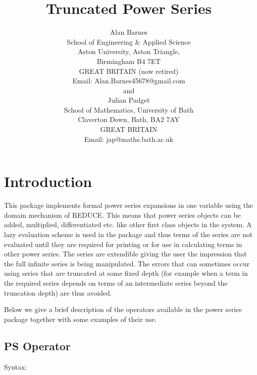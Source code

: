 \title{Truncated Power Series}
\date{}
\author{Alan Barnes \\
School of Engineering \& Applied Science  \\
Aston University, Aston Triangle, \\
Birmingham B4 7ET \\ GREAT BRITAIN  (now retired)\\
Email: Alan.Barnes45678@gmail.com \\[0.1in]
and \\[0.1in]
Julian Padget \\
School of Mathematics, University of Bath \\
Claverton Down, Bath, BA2 7AY \\
GREAT BRITAIN \\
Email: jap@maths.bath.ac.uk}

\maketitle
{} 
 
\section{Introduction}
This package implements formal power series expansions in one
variable using the domain mechanism of REDUCE. This means that power
series objects can be added, multiplied, differentiated etc. like other
first class objects in the system. A lazy evaluation scheme is used in
the package and thus terms of the series are not evaluated until they
are required for printing or for use in calculating terms in other
power series. The series are extendible giving the user the impression
that the full infinite series is being manipulated.  The errors that
can sometimes occur using series that are truncated at some fixed depth
(for example when a term in the required series depends on terms of an
intermediate series beyond the truncation depth) are thus avoided.

Below we give a brief description of the operators available in the
power series package together with some examples of their use.

\subsection{PS Operator}

Syntax:


